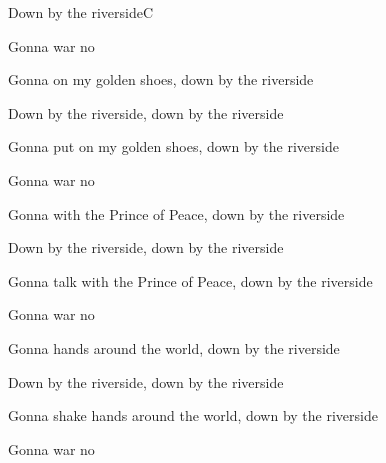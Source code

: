 \begin{SBSong}{Down by the riverside}{C}
\begin{SBVerse}
    Gonna  war no 
  \end{SBVerse}
  \begin{SBVerse}
    Gonna  on my golden shoes, down by the riverside

    Down by the riverside, down by the riverside
    
    Gonna put on my golden shoes, down by the riverside

    Gonna  war no 
  \end{SBVerse}
  \begin{SBVerse}
    Gonna  with the Prince of Peace, down by the riverside

    Down by the riverside, down by the riverside
    
    Gonna talk with the Prince of Peace, down by the riverside

    Gonna  war no 
  \end{SBVerse}
  \begin{SBVerse}
    Gonna  hands around the world, down by the riverside

    Down by the riverside, down by the riverside
    
    Gonna shake hands around the world, down by the riverside

    Gonna  war no 
  \end{SBVerse}
\end{SBSong}
